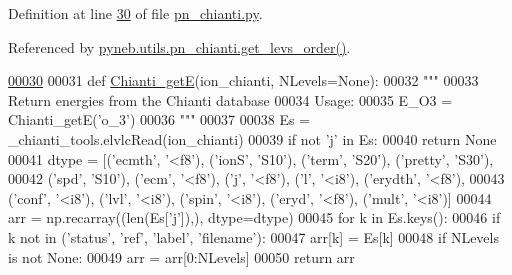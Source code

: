 Definition at line \hyperlink{pn__chianti_8py_source_l00030}{30} of file \hyperlink{pn__chianti_8py_source}{pn\-\_\-chianti.\-py}.



Referenced by \hyperlink{pn__chianti_8py_source_l00051}{pyneb.\-utils.\-pn\-\_\-chianti.\-get\-\_\-levs\-\_\-order()}.


\begin{DoxyCode}
\hypertarget{namespacepyneb_1_1utils_1_1pn__chianti_l00030}{}\hyperlink{namespacepyneb_1_1utils_1_1pn__chianti_af2ab54887a9b6970ef047eb14a81357d}{00030} 
00031 \textcolor{keyword}{def }\hyperlink{namespacepyneb_1_1utils_1_1pn__chianti_af2ab54887a9b6970ef047eb14a81357d}{Chianti\_getE}(ion\_chianti, NLevels=None):
00032     \textcolor{stringliteral}{"""}
00033 \textcolor{stringliteral}{    Return energies from the Chianti database}
00034 \textcolor{stringliteral}{    Usage:}
00035 \textcolor{stringliteral}{        E\_O3 = Chianti\_getE('o\_3')}
00036 \textcolor{stringliteral}{    """}
00037     
00038     Es = \_chianti\_tools.elvlcRead(ion\_chianti)
00039     \textcolor{keywordflow}{if} \textcolor{keywordflow}{not} \textcolor{stringliteral}{'j'} \textcolor{keywordflow}{in} Es:
00040         \textcolor{keywordflow}{return} \textcolor{keywordtype}{None}
00041     dtype = [(\textcolor{stringliteral}{'ecmth'}, \textcolor{stringliteral}{'<f8'}), (\textcolor{stringliteral}{'ionS'}, \textcolor{stringliteral}{'S10'}), (\textcolor{stringliteral}{'term'}, \textcolor{stringliteral}{'S20'}),  (\textcolor{stringliteral}{'pretty'}, \textcolor{stringliteral}{'S30'}), 
00042              (\textcolor{stringliteral}{'spd'}, \textcolor{stringliteral}{'S10'}), (\textcolor{stringliteral}{'ecm'}, \textcolor{stringliteral}{'<f8'}), (\textcolor{stringliteral}{'j'}, \textcolor{stringliteral}{'<f8'}), (\textcolor{stringliteral}{'l'}, \textcolor{stringliteral}{'<i8'}), (\textcolor{stringliteral}{'erydth'}, \textcolor{stringliteral}{'<f8'}), 
00043              (\textcolor{stringliteral}{'conf'}, \textcolor{stringliteral}{'<i8'}), (\textcolor{stringliteral}{'lvl'}, \textcolor{stringliteral}{'<i8'}), (\textcolor{stringliteral}{'spin'}, \textcolor{stringliteral}{'<i8'}), (\textcolor{stringliteral}{'eryd'}, \textcolor{stringliteral}{'<f8'}), (\textcolor{stringliteral}{'mult'}, \textcolor{stringliteral}{'<i8'})]
00044     arr = np.recarray((len(Es[\textcolor{stringliteral}{'j'}]),), dtype=dtype)
00045     \textcolor{keywordflow}{for} k \textcolor{keywordflow}{in} Es.keys():
00046         \textcolor{keywordflow}{if} k \textcolor{keywordflow}{not} \textcolor{keywordflow}{in} (\textcolor{stringliteral}{'status'}, \textcolor{stringliteral}{'ref'}, \textcolor{stringliteral}{'label'}, \textcolor{stringliteral}{'filename'}):
00047             arr[k] = Es[k]
00048     \textcolor{keywordflow}{if} NLevels \textcolor{keywordflow}{is} \textcolor{keywordflow}{not} \textcolor{keywordtype}{None}:
00049         arr = arr[0:NLevels]
00050     \textcolor{keywordflow}{return} arr

\end{DoxyCode}
